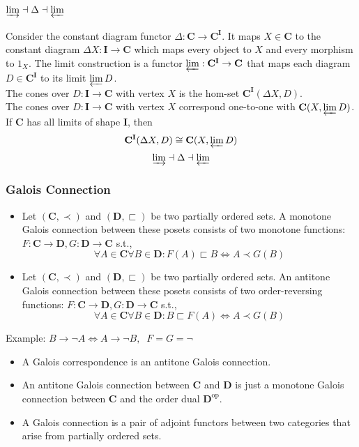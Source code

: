 \documentclass[UTF8,11pt,colorlinks,compress,openany]{beamer}%
\begin{document}
\begin{frame}\frametitle{$\varinjlim\dashv\Delta\dashv\varprojlim$}
Consider the constant diagram functor $\Delta:\mathbf{C}\to\mathbf{C}^\mathbf{I}$. It maps $X\in\mathbf{C}$ to the constant diagram $\Delta X: \mathbf{I}\to\mathbf{C}$ which maps every object to $X$ and every morphism to $1_X$. The limit construction is a functor $\varprojlim:\mathbf{C}^\mathbf{I}\to\mathbf{C}$ that maps each diagram $D\in\mathbf{C}^\mathbf{I}$ to its limit $\varprojlim D$.\\
The cones over $D:\mathbf{I}\to\mathbf{C}$ with vertex $X$ is the hom-set $\mathbf{C}^\mathbf{I}(\Delta X,D)$.\\
The cones over $D:\mathbf{I}\to\mathbf{C}$ with vertex $X$ correspond one-to-one with $\mathbf{C}(X,\varprojlim D)$.\\
If $\mathbf{C}$ has all limits of shape $\mathbf{I}$, then
\[\mathbf{C}^\mathbf{I}(\Delta X,D)\cong\mathbf{C}(X,\varprojlim D)\]
\[\varinjlim\dashv\Delta\dashv\varprojlim\]
\end{frame}

\begin{frame}\frametitle{Galois Connection}
\setlength\abovedisplayskip{0pt}
\setlength\belowdisplayskip{0pt}
\begin{definition}
\begin{itemize}
	\item Let $(\mathbf{C},\prec)$ and $(\mathbf{D},\sqsubset)$ be two partially ordered sets. A monotone Galois connection between these posets consists of two monotone functions: $F:\mathbf{C}\to\mathbf{D}, G:\mathbf{D}\to\mathbf{C}$ s.t.,
\[\forall A\in\mathbf{C}\forall B\in\mathbf{D}: F(A)\sqsubset B\iff A\prec G(B)\]
	\item Let $(\mathbf{C},\prec)$ and $(\mathbf{D},\sqsubset)$ be two partially ordered sets. An antitone Galois connection between these posets consists of two order-reversing functions: $F:\mathbf{C}\to\mathbf{D}, G:\mathbf{D}\to\mathbf{C}$ s.t.,
\[\forall A\in\mathbf{C}\forall B\in\mathbf{D}: B\sqsubset F(A)\iff A\prec G(B)\]
\end{itemize}
\end{definition}
Example: $B\to\neg A\iff A\to\neg B,\;\;F=G=\neg$
\begin{itemize}
	\item A Galois correspondence is an antitone Galois connection.
	\item An antitone Galois connection between $\mathbf{C}$ and $\mathbf{D}$ is just a monotone Galois connection between $\mathbf{C}$ and the order dual $\mathbf{D}^{\mathrm{op}}$.
	\item A Galois connection is a pair of adjoint functors between two categories that arise from partially ordered sets.
\end{itemize}
\end{frame}
\end{document}
